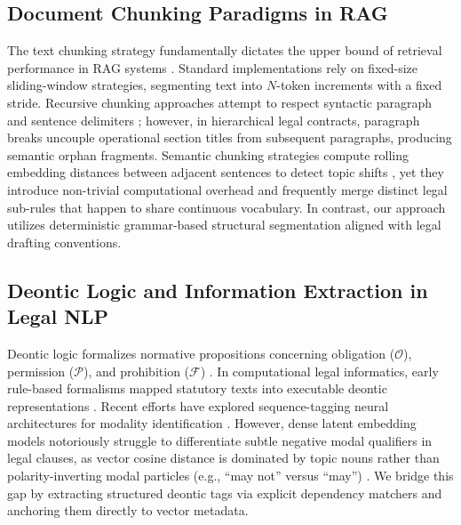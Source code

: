 \documentclass[conference]{IEEEtran}
\begin{document}
\subsection{Document Chunking Paradigms in RAG}
The text chunking strategy fundamentally dictates the upper bound of retrieval performance in RAG systems \cite{gao2023retrieval}. Standard implementations rely on fixed-size sliding-window strategies, segmenting text into $N$-token increments with a fixed stride. Recursive chunking approaches attempt to respect syntactic paragraph and sentence delimiters \cite{karpukhin2020dense}; however, in hierarchical legal contracts, paragraph breaks uncouple operational section titles from subsequent paragraphs, producing semantic orphan fragments. Semantic chunking strategies compute rolling embedding distances between adjacent sentences to detect topic shifts \cite{barnett2024seven}, yet they introduce non-trivial computational overhead and frequently merge distinct legal sub-rules that happen to share continuous vocabulary. In contrast, our approach utilizes deterministic grammar-based structural segmentation aligned with legal drafting conventions.

\subsection{Deontic Logic and Information Extraction in Legal NLP}
Deontic logic formalizes normative propositions concerning obligation ($\mathcal{O}$), permission ($\mathcal{P}$), and prohibition ($\mathcal{F}$) \cite{vonwright1951deontic}. In computational legal informatics, early rule-based formalisms mapped statutory texts into executable deontic representations \cite{sartor2005legal, governatori2005deontic}. Recent efforts have explored sequence-tagging neural architectures for modality identification \cite{chalkidis2022lexglue, guha2024legalbench}. However, dense latent embedding models notoriously struggle to differentiate subtle negative modal qualifiers in legal clauses, as vector cosine distance is dominated by topic nouns rather than polarity-inverting modal particles (e.g., ``may not'' versus ``may'') \cite{guha2024legalbench}. We bridge this gap by extracting structured deontic tags via explicit dependency matchers and anchoring them directly to vector metadata.
\end{document}
